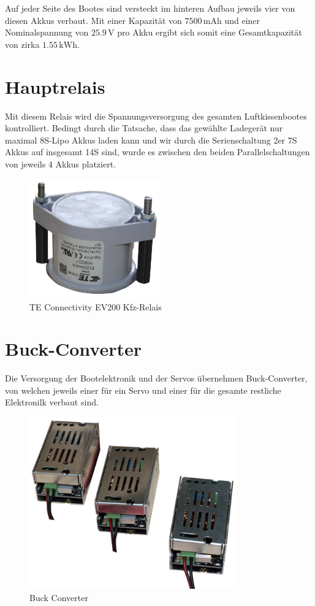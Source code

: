 Auf jeder Seite des Bootes sind versteckt im hinteren Aufbau jeweils vier von diesen Akkus verbaut. Mit einer Kapazität von $7500\,\textrm{mAh}$ und einer Nominalspannung von $25.9\,\mathrm{V}$ pro Akku ergibt sich somit eine Gesamtkapazität von zirka $1.55\,\mathrm{kWh}$.

\newpage
\section{Hauptrelais}
Mit diesem Relais wird die Spannungsversorgung des gesamten Luftkissenbootes kontrolliert. Bedingt durch die Tatsache, dass das gewählte Ladegerät nur maximal 8S-Lipo Akkus laden kann und wir durch die Serienschaltung 2er 7S Akkus auf insgesamt 14S sind, wurde es zwischen den beiden Parallelschaltungen von jeweils 4 Akkus platziert. 
\begin{figure}[h]
    \centering
    \includegraphics[width=0.5\textwidth]{Fotos/Hauptrelais.png}
    \caption{TE Connectivity EV200 Kfz-Relais}
\end{figure}

\newpage
\section{Buck-Converter}
Die Versorgung der Bootelektronik und der Servos übernehmen Buck-Converter, von welchen jeweils einer für ein Servo und einer für die gesamte restliche Elektronilk verbaut sind.
\begin{figure}[h]
    \centering
    \includegraphics[width=0.8\textwidth]{Fotos/Buck_Converter.png}
    \caption{Buck Converter}
\end{figure}
\newpage

